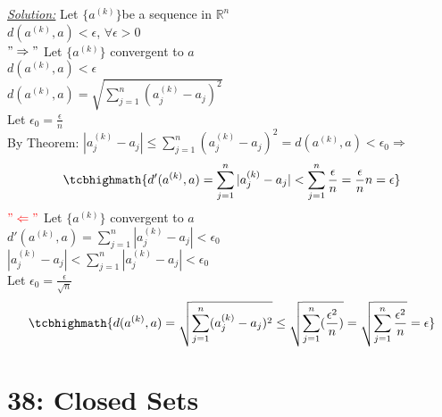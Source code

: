 \documentclass{article}
\begin{document}
\begin{tcolorbox}[enhanced,attach boxed title to top center={yshift=-3mm,yshifttext=-1mm},
  colback=blue!5!white,colframe=blue!75!black,colbacktitle=red!80!black,
  title=Exercise 37.9 (b):,fonttitle=\bfseries,
  boxed title style={size=small,colframe=red!50!black} ]
   \textit{\color{blue}\underline{Solution:}}
Let $\{a^{(k)}\}$be a sequence in $\mathbb{R}^n$\\
$d(a^{(k)},a)<\epsilon$, $\forall\epsilon>0$\\
{\color{red}$"\Rightarrow"$} Let $\{a^{(k)}\}$ convergent to $a$\\
$d(a^{(k)},a)<\epsilon$\\
$d(a^{(k)},a)=\sqrt{\sum_{j=1}^{n}(a_j^{(k)}-a_j)^2}$\\
Let $\epsilon_0=\frac{\epsilon}{n}$\\
By Theorem: $|a_j^{(k)}-a_j|\leq{\sum_{j=1}^{n}(a_j^{(k)}-a_j)^2}=d(a^{(k)},a)<\epsilon_0\Rightarrow$\\ 
  $$\tcbhighmath{d'(a^{(k)},a)=\sum_{j=1}^{n}|a_j^{(k)}-a_j|<\sum_{j=1}^{n}\frac{\epsilon}{n}=\frac{\epsilon}{n}n=\epsilon}$$
$\color{red}"\Leftarrow"$ Let $\{a^{(k)}\}$ convergent to $a$\\
$d'(a^{(k)},a)=\sum_{j=1}^{n}|a_j^{(k)}-a_j|<\epsilon_0$\\
$|a_j
^{(k)}-a_j|<\sum_{j=1}^{n}|a_j^{(k)}-a_j|<\epsilon_0$\\
Let $\epsilon_0=\frac{\epsilon}{\sqrt{n}}$\\
 $$\tcbhighmath{d(a^{(k)},a)=\sqrt{\sum_{j=1}^{n}(a_j^{(k)}-a_j)^2}\leq \sqrt{\sum_{j=1}^{n}(\frac{\epsilon^2}{n})}=\sqrt{\sum_{j=1}^{n}\frac{\epsilon^2}{n}}=\epsilon}$$
 \end{tcolorbox}




\section*{38: Closed Sets}
\end{document}
